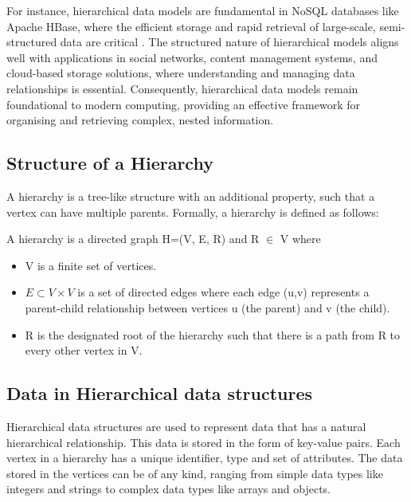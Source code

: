 For instance, hierarchical data models are fundamental in NoSQL databases like Apache HBase, where the efficient storage and rapid retrieval of large-scale, semi-structured data are critical \cite{DBLP:books/daglib/0027893}. The structured nature of hierarchical models aligns well with applications in social networks, content management systems, and cloud-based storage solutions, where understanding and managing data relationships is essential.
Consequently, hierarchical data models remain foundational to modern computing, providing an effective framework for organising and retrieving complex, nested information.

\subsection{Structure of a Hierarchy}
A hierarchy is a tree-like structure with an additional property, such that a vertex can have multiple parents.
Formally, a hierarchy is defined as follows:

\begin{definition}
    A hierarchy is a directed graph H=(V, E, R) and R $\in$ V where
    \begin{itemize}
        \item V is a finite set of vertices.
        \item $E \subset V \times V$ is a set of directed edges where each edge (u,v) represents a parent-child relationship between vertices u (the parent) and v (the child).
        \item R is the designated root of the hierarchy such that there is a path from R to every other vertex in V.
        
    \end{itemize} 
\end{definition}

\subsection{Data in Hierarchical data structures}

Hierarchical data structures are used to represent data that has a natural hierarchical relationship. This data is stored in the form of key-value pairs. Each vertex in a hierarchy has a unique identifier, type and set of attributes. The data stored in the vertices can be of any kind, ranging from simple data types like integers and strings to complex data types like arrays and objects. 

